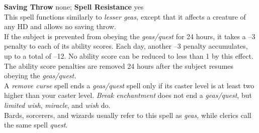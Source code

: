 \textbf{Saving Throw} none; \textbf{Spell Resistance }yes\\
This spell functions similarly to \textit{lesser geas, }except that it affects a creature of any HD and allows no saving throw.\\
If the subject is prevented from obeying the \textit{geas/quest }for 24 hours, it takes a –3 penalty to each of its ability scores. Each day, another –3 penalty accumulates, up to a total of –12. No ability score can be reduced to less than 1 by this effect. The ability score penalties are removed 24 hours after the subject resumes obeying the \textit{geas/quest.}\\
A \textit{remove curse }spell ends a \textit{geas/quest }spell only if its caster level is at least two higher than your caster level. \textit{Break enchantment }does not end a \textit{geas/quest}, but \textit{limited wish}, \textit{miracle}, and \textit{wish }do.\\
Bards, sorcerers, and wizards usually refer to this spell as \textit{geas, }while clerics call the same spell \textit{quest}.\\
